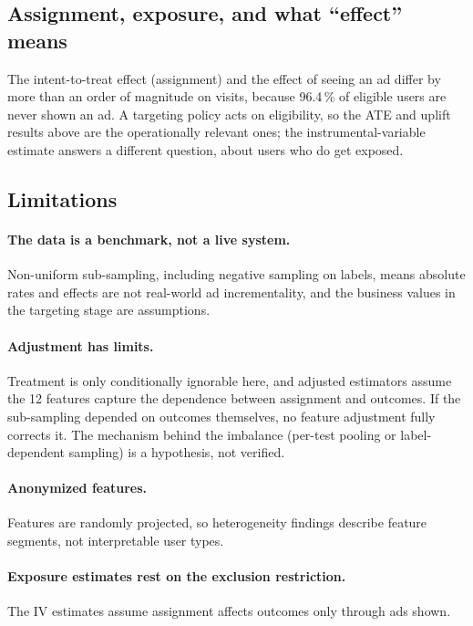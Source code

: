 \subsection{Assignment, exposure, and what ``effect'' means}
\label{sec:assignment}

The intent-to-treat effect (assignment) and the effect of seeing an ad differ
by more than an order of magnitude on visits, because 96.4\,\% of eligible
users are never shown an ad. A targeting policy acts on eligibility, so the
ATE and uplift results above are the operationally relevant ones; the
instrumental-variable estimate answers a different question, about users who
do get exposed.

\subsection{Limitations}
\label{sec:limitations}

\paragraph{The data is a benchmark, not a live system.} Non-uniform
sub-sampling, including negative sampling on labels, means absolute rates and
effects are not real-world ad incrementality, and the business values in the
targeting stage are assumptions.

\paragraph{Adjustment has limits.} Treatment is only conditionally ignorable
here, and adjusted estimators assume the 12 features capture the dependence
between assignment and outcomes. If the sub-sampling depended on outcomes
themselves, no feature adjustment fully corrects it. The mechanism behind
the imbalance (per-test pooling or label-dependent sampling) is a
hypothesis, not verified.

\paragraph{Anonymized features.} Features are randomly projected, so
heterogeneity findings describe feature segments, not interpretable user
types.

\paragraph{Exposure estimates rest on the exclusion restriction.} The IV
estimates assume assignment affects outcomes only through ads shown.

